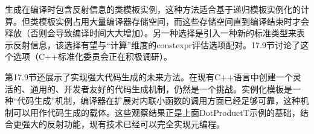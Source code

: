 生成在编译时包含反射信息的类模板实例，这种方法适合基于递归模板实例化的计算。但类模板实例占用大量编译器存储空间，而这些存储空间直到编译结束时才会释放（否则会导致编译时间大大增加）。另一种选择是引入一种新的标准类型来表示反射信息，该选择有望与“计算”维度的constexpr评估选项配对。17.9节讨论了这个选项（C++标准化委员会正在积极调研）。

第17.9节还展示了实现强大代码生成的未来方法。在现有C++语言中创建一个灵活的、通用的、开发者友好的代码生成机制，仍然是一个挑战。实例化模板是一种“代码生成”机制，编译器在扩展对内联小函数的调用方面已经足够可靠，这种机制可以用作代码生成的载体。这些观察结果正是上面DotProductT示例的基础，结合更强大的反射功能，现有技术已经可以完全实现元编程。











































